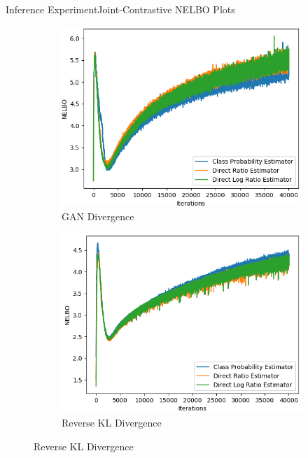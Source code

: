 \documentclass{beamer}
\begin{document}
\begin{frame}{Inference Experiment}{Joint-Contrastive NELBO Plots}
\begin{figure}
\begin{subfigure}{0.49\textwidth}
\includegraphics[width=\linewidth]{nelbos/JCADVvsJCADVexpvsJCADVgudlog.png}
\caption{GAN Divergence}
\end{subfigure}
\begin{subfigure}{0.49\textwidth}
\includegraphics[width=\linewidth]{nelbos/JCKLDvsJCKLexpvsJCKLgudlog.png}
\caption{Reverse KL Divergence}
\end{subfigure}
\end{figure}
\end{frame}
\end{document}
